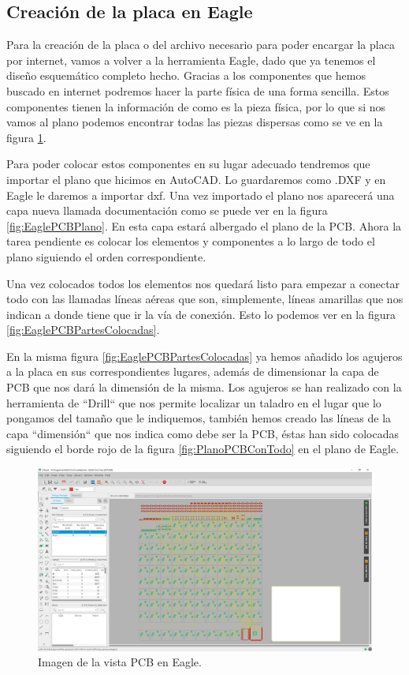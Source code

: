 \subsection{Creación de la placa en Eagle}

Para la creación de la placa o del archivo necesario para poder encargar la placa por internet, vamos a volver a la herramienta Eagle, dado que ya tenemos el diseño esquemático completo hecho. Gracias a los componentes que hemos buscado en internet podremos hacer la parte física de una forma sencilla. Estos componentes tienen la información de como es la pieza física, por lo que si nos vamos al plano podemos encontrar todas las piezas dispersas como se ve en la figura \ref{fig:EaglePCBNueva}.

Para poder colocar estos componentes en su lugar adecuado tendremos que importar el plano que hicimos en AutoCAD. Lo guardaremos como .DXF y en Eagle le daremos a importar dxf. Una vez importado el plano nos aparecerá una capa nueva llamada documentación como se puede ver en la figura \ref{fig:EaglePCBPlano}. En esta capa estará albergado el plano de la \gls{PCB}. Ahora la tarea pendiente es colocar los elementos y componentes a lo largo de todo el plano siguiendo el orden correspondiente.

Una vez colocados todos los elementos nos quedará listo para empezar a conectar todo con las llamadas líneas aéreas que son, simplemente, líneas amarillas que nos indican a donde tiene que ir la vía de conexión. Esto lo podemos ver en la figura \ref{fig:EaglePCBPartesColocadas}. 

En la misma figura \ref{fig:EaglePCBPartesColocadas} ya hemos añadido los agujeros a la placa en sus correspondientes lugares, además de dimensionar la capa de \gls{PCB} que nos dará la dimensión de la misma. Los agujeros se han realizado con la herramienta de ``Drill`` que nos permite localizar un taladro en el lugar que lo pongamos del tamaño que le indiquemos, también hemos creado las líneas de la capa ``dimensión`` que nos indica como debe ser la \gls{PCB}, éstas han sido colocadas siguiendo el borde rojo de la figura \ref{fig:PlanoPCBConTodo} en el plano de Eagle.
\newpage

\begin{figure}[H]
    \centering
    \includegraphics[width=1\textwidth]{imagenes/Capitulos/Cap05/EaglePCBNueva.png}
    \caption{Imagen de la vista \gls{PCB} en Eagle.}
    \label{fig:EaglePCBNueva}
\end{figure}

